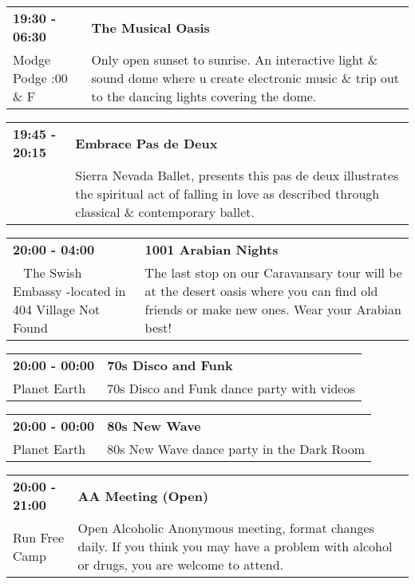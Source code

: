 \begin{tabular}{ p{1in} p{2.2in} }
    \textbf{19:30 - 06:30} & \textbf{The Musical Oasis} \\
    Modge Podge \newline 9:00 \& F & Only open sunset to sunrise.  An interactive light \& sound dome where u create electronic music \& trip out to the dancing lights covering the dome. \\
    \hline 
\end{tabular}
    
\begin{tabular}{ p{1in} p{2.2in} }
    \textbf{19:45 - 20:15} & \textbf{Embrace Pas de Deux} \\
    ~ \newline  & Sierra Nevada Ballet, presents this pas de deux illustrates the spiritual act of falling in love as described through classical \& contemporary ballet. \\
    \hline 
\end{tabular}
    
\begin{tabular}{ p{1in} p{2.2in} }
    \textbf{20:00 - 04:00} & \textbf{1001 Arabian Nights} \\
    ~ \newline The Swish Embassy -located in 404 Village Not Found & The last stop on our Caravansary tour will be at the desert oasis where you can find old friends or make new ones. Wear your Arabian best! \\
    \hline 
\end{tabular}
    
\begin{tabular}{ p{1in} p{2.2in} }
    \textbf{20:00 - 00:00} & \textbf{70s Disco and Funk} \\
    Planet Earth \newline  & 70s Disco and Funk dance party with videos \\
    \hline 
\end{tabular}
    
\begin{tabular}{ p{1in} p{2.2in} }
    \textbf{20:00 - 00:00} & \textbf{80s New Wave} \\
    Planet Earth \newline  & 80s New Wave dance party in the Dark Room \\
    \hline 
\end{tabular}
    
\begin{tabular}{ p{1in} p{2.2in} }
    \textbf{20:00 - 21:00} & \textbf{AA Meeting (Open)} \\
    Run Free Camp \newline  & Open Alcoholic Anonymous meeting, format changes daily. If you think you may have a problem with alcohol or drugs, you are welcome to attend. \\
    \hline 
\end{tabular}
    
